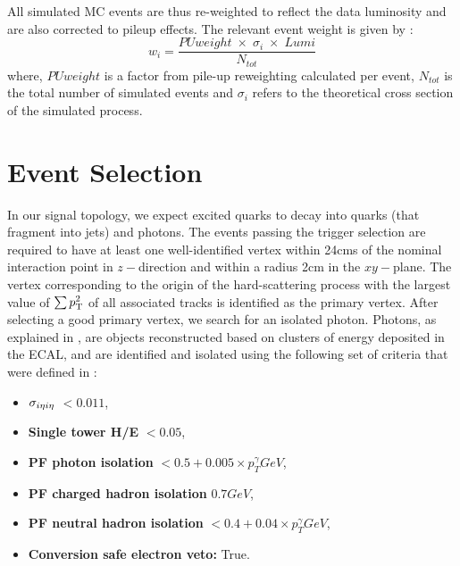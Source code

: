 All simulated MC events are thus re-weighted to reflect the data luminosity and are also corrected to pileup effects. The relevant event weight is given by :
\begin{equation}
w_{i} = \frac{PUweight\; \times\;\sigma_{i}\;\times\;Lumi}{N_{tot}}
\end{equation}
where, $PUweight$ is a factor from pile-up reweighting calculated per event, $N_{tot}$ is the total number of simulated events and $\sigma_{i}$
refers to the theoretical cross section of the simulated process. 

\section{Event Selection }
In our signal topology, we expect excited quarks to decay into quarks (that fragment into jets) and photons. The events passing the trigger selection 
are required to have at least one well-identified vertex within 24\unit{cms} of the nominal interaction point in $z-$direction and within a radius 
2\unit{cm} in the $xy-$plane. The vertex corresponding to the origin of the hard-scattering process with the largest value of $\sum p_{\mathrm T}^{\mathrm{2}}$ of 
all associated tracks is identified as the primary vertex. After selecting a good primary vertex, we search for an isolated photon. Photons, as 
explained in \sectn{\ref{Se:photonReco}}, are objects reconstructed based on clusters of energy deposited in the ECAL, and are identified and 
isolated using the following set of criteria that were defined in \sectn{\ref{Se:photonId}}:
\begin{itemize}
\item {\boldmath$\sigma_{i{\eta}i{\eta}}$} $<0.011$,
\item {\bf Single tower H/E} $<0.05$,
\item {\bf PF photon isolation} $<0.5+0.005 \times p_{T}^{\gamma}\unit{GeV}$,
\item {\bf PF charged hadron isolation} $0.7\unit{GeV}$,
\item {\bf PF neutral hadron isolation} $<0.4+0.04 \times p_{T}^{\gamma}\unit{GeV}$,
\item {\bf Conversion safe electron veto:} True.
\end{itemize}

